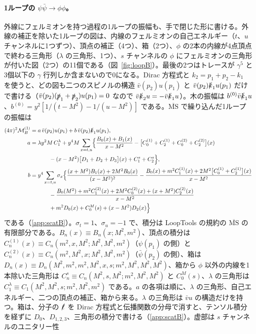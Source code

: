 \documentclass[a4paper,10pt]{ltjsarticle}
\newcommand{\MSbar}{\overline{\mathrm{MS}}}
\begin{document}
\paragraph{1ループの $\psi\bar\psi\to\phi\phi$。}外線にフェルミオンを持つ過程の1ループの振幅も、手で閉じた形に書ける。外線の補正を除いた1ループの図は、内線のフェルミオンの自己エネルギー（$t$、$u$ チャンネルに1つずつ）、頂点の補正（4つ）、箱（2つ）、$\phi$ の2本の内線が4点頂点で終わる三角形（$\lambda$ の三角形、1つ）、$s$ チャンネルの $\phi$ にフェルミオンの三角形が付いた図（2つ）の11個である（図~\ref{fig:loopB}）。最後の2つはトレースが $\gamma^5$ と3個以下の $\gamma$ 行列しか含まないので0になる。Dirac 方程式と $k_2=p_1+p_2-k_1$ を使うと、どの図も二つのスピノルの構造 $\bar v(p_2)u(p_1)$ と $\bar v(p_2)\slashed k_1u(p_1)$ だけで書ける（$\bar v(p_2)(\slashed p_1+\slashed p_2)u(p_1)=0$ なので $\bar v\slashed k_2u=-\bar v\slashed k_1u$）。木の振幅は $b^{(0)}\bar v\slashed k_1u$、$b^{(0)}=y^2[1/(t-M^2)-1/(u-M^2)]$ である。$\MSbar$ で繰り込んだ1ループの振幅は
\begin{equation}
\begin{aligned}
(4\pi)^2\mathcal M_B^{(1)}={}&a\,\bar v(p_2)u(p_1)+b\,\bar v(p_2)\slashed k_1u(p_1),\\
a={}&\lambda y^2M\,C^\lambda_1+y^4M\sum_{x=t,u}\Bigl\{\frac{B_0(x)+B_1(x)}{x-M^2}-\bigl[C^{(1)}_0+C^{(1)}_2+C^{(2)}_0+C^{(2)}_2\bigr](x)\\
&\qquad-(x-M^2)\bigl[D_1+D_2+D_3\bigr](x)+C^s_1+C^s_2\Bigr\},\\
b={}&y^4\sum_{x=t,u}\sigma_x\Bigl\{\frac{(x+M^2)B_1(x)+2M^2B_0(x)}{(x-M^2)^2}-\frac{B_0(x)+m^2C^{(1)}_1(x)+2M^2\bigl[C^{(1)}_0+C^{(1)}_2\bigr](x)}{x-M^2}\\
&\qquad-\frac{B_0(M^2)+m^2C^{(2)}_1(x)+2M^2C^{(2)}_0(x)+(x+M^2)C^{(2)}_2(x)}{x-M^2}\\
&\qquad+m^2D_0(x)+C_0^M(s)+(x-M^2)D_2(x)\Bigr\}
\end{aligned}
\label{eq:M1B}
\end{equation}
である（\ref{app:scatB}）。$\sigma_t=1$、$\sigma_u=-1$ で、積分は LoopTools の規約の $\MSbar$ の有限部分である。$B_n(x)\equiv B_n(x;M^2,m^2)$、頂点の積分は $C^{(1)}_n(x)\equiv C_n(m^2,x,M^2;M^2,M^2,m^2)$（$\psi(p_1)$ の側）と $C^{(2)}_n(x)\equiv C_n(m^2,M^2,x;M^2,M^2,m^2)$（$\bar\psi(p_2)$ の側）、箱は $D_n(x)\equiv D_n(M^2,m^2,m^2,M^2,x,s;m^2,M^2,M^2,M^2)$、箱から $\phi$ 以外の内線を1本除いた三角形は $C^s_n\equiv C_n(M^2,s,M^2;m^2,M^2,M^2)$ と $C_0^M(s)$、$\lambda$ の三角形は $C^\lambda_1\equiv C_1(M^2,M^2,s;m^2,M^2,m^2)$ である。$a$ の各項は順に、$\lambda$ の三角形、自己エネルギー、二つの頂点の補正、箱から来る。$\lambda$ の三角形は $\bar vu$ の構造だけを持つ。箱は、分子の $\slashed\ell$ を Dirac 方程式と伝播関数の分母で消すと、テンソル積分を経ずに $D_0$、$D_{1,2,3}$、三角形の積分で書ける（\ref{app:scatB}）。虚部は $s$ チャンネルのユニタリー性
\end{document}
